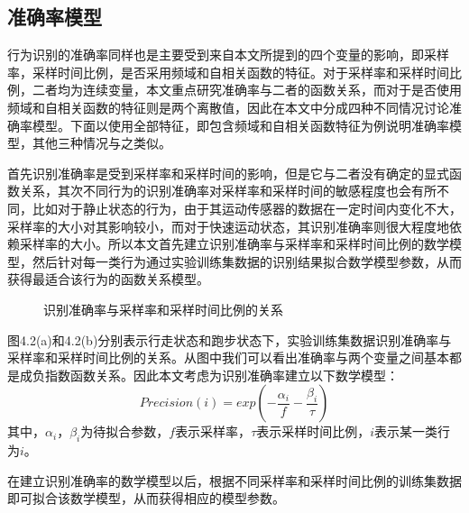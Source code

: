 \subsection{准确率模型}
\par 行为识别的准确率同样也是主要受到来自本文所提到的四个变量的影响，即采样率，采样时间比例，是否采用频域和自相关函数的特征。对于采样率和采样时间比例，二者均为连续变量，本文重点研究准确率与二者的函数关系，而对于是否使用频域和自相关函数的特征则是两个离散值，因此在本文中分成四种不同情况讨论准确率模型。下面以使用全部特征，即包含频域和自相关函数特征为例说明准确率模型，其他三种情况与之类似。
\par 首先识别准确率是受到采样率和采样时间的影响，但是它与二者没有确定的显式函数关系，其次不同行为的识别准确率对采样率和采样时间的敏感程度也会有所不同，比如对于静止状态的行为，由于其运动传感器的数据在一定时间内变化不大，采样率的大小对其影响较小，而对于快速运动状态，其识别准确率则很大程度地依赖采样率的大小。所以本文首先建立识别准确率与采样率和采样时间比例的数学模型，然后针对每一类行为通过实验训练集数据的识别结果拟合数学模型参数，从而获得最适合该行为的函数关系模型。

\begin{figure}[!htb]
    \centering
    \caption{识别准确率与采样率和采样时间比例的关系}
\end{figure}

\par 图4.2(a)和4.2(b)分别表示行走状态和跑步状态下，实验训练集数据识别准确率与采样率和采样时间比例的关系。从图中我们可以看出准确率与两个变量之间基本都是成负指数函数关系。因此本文考虑为识别准确率建立以下数学模型：
\begin{equation}
	Precision(i) = exp(-\frac{\alpha_i}{f} - \frac{\beta_i}{\tau})
\end{equation}
其中，$\alpha_i$，$\beta_i$为待拟合参数，$f$表示采样率，$\tau$表示采样时间比例，$i$表示某一类行为$i$。
\par 在建立识别准确率的数学模型以后，根据不同采样率和采样时间比例的训练集数据即可拟合该数学模型，从而获得相应的模型参数。
